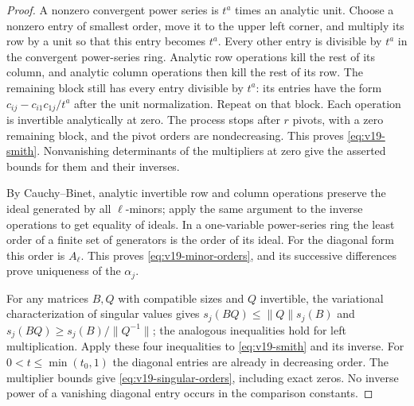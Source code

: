 \documentclass[11pt]{amsart}
\theoremstyle{definition}\newtheorem{definition}[theorem]{Definition}
\theoremstyle{remark}\newtheorem{remark}[theorem]{Remark}
\begin{document}
\begin{proof}
A nonzero convergent power series is $t^a$ times an analytic unit.
Choose a nonzero entry of smallest order, move it to the upper left
corner, and multiply its row by a unit so that this entry becomes
$t^a$. Every other entry is divisible by $t^a$ in the convergent
power-series ring. Analytic row operations kill the rest of its
column, and analytic column operations then kill the rest of its row.
The remaining block still has every entry divisible by $t^a$:
its entries have the form $c_{ij}-c_{i1}c_{1j}/t^a$ after the unit
normalization. Repeat on that block. Each operation is invertible
analytically at zero. The process stops after $r$ pivots, with a zero
remaining block, and the pivot orders are nondecreasing. This proves
\eqref{eq:v19-smith}. Nonvanishing determinants of the multipliers
at zero give the asserted bounds for them and their inverses.

By Cauchy--Binet, analytic invertible row and column operations
preserve the ideal generated by all $\ell$-minors; apply the same
argument to the inverse operations to get equality of ideals.
In a one-variable power-series ring the least order of a finite
set of generators is the order of its ideal. For the diagonal form
this order is $A_\ell$. This proves \eqref{eq:v19-minor-orders},
and its successive differences prove uniqueness of the $\alpha_j$.

For any matrices $B,Q$ with compatible sizes and $Q$ invertible,
the variational characterization of singular values gives
$s_j(BQ)\le\|Q\|s_j(B)$ and
$s_j(BQ)\ge s_j(B)/\|Q^{-1}\|$; the analogous inequalities hold
for left multiplication. Apply these four inequalities to
\eqref{eq:v19-smith} and its inverse. For $0<t\le\min(t_0,1)$
the diagonal entries are already in decreasing order. The multiplier
bounds give \eqref{eq:v19-singular-orders}, including exact zeros.
No inverse power of a vanishing diagonal entry occurs in the
comparison constants.
\end{proof}
\end{document}
